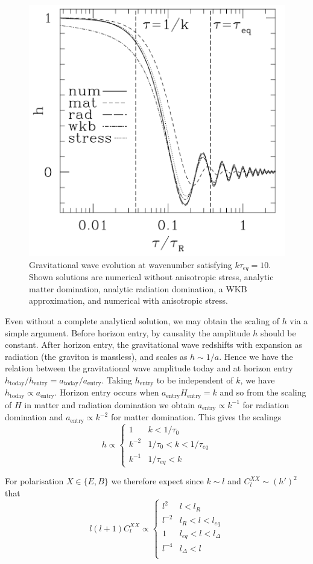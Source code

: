 \documentclass[a4paper,10pt]{article}
\begin{document}
\begin{figure}[h]
  \includegraphics[width=0.5\linewidth]{gravwaveev.png}
  \centering
  \caption{Gravitational wave evolution at wavenumber satisfying $k\tau_{eq}=10$. Shown solutions are numerical without anisotropic stress, analytic matter domination, analytic radiation domination, a WKB approximation, and numerical with anisotropic stress.}
  \label{gravwave}
\end{figure}

Even without a complete analytical solution, we may obtain the scaling of $h$ via a simple argument. Before horizon entry,  by causality the amplitude $h$ should be constant. After horizon entry, the gravitational wave redshifts with expansion as radiation (the graviton is massless), and scales as $h\sim 1/a$. Hence we have the relation between the gravitational wave amplitude today and at horizon entry $h_{\text{today}}/h_{\text{entry}} = a_{\text{today}}/a_{\text{entry}}$. Taking $h_{\text{entry}}$ to be independent of $k$, we have $h_{\text{today}}\propto a_{\text{entry}}$. Horizon entry occurs when $a_{\text{entry}}H_{\text{entry}}=k$ and so from the scaling of $H$ in matter and radiation domination we obtain $a_{\text{entry}}\propto k^{-1}$ for radiation domination and $a_{\text{entry}}\propto k^{-2}$ for matter domination. This gives the scalings
\begin{equation}
  h \propto
    \begin{cases}
      1 & k<1/\tau_0\\
      k^{-2} & 1/\tau_0<k<1/\tau_{eq}\\
      k^{-1} & 1/\tau_{eq}<k
    \end{cases}       
\end{equation}

For polarisation $X\in\{E,B\}$ we therefore expect since $k\sim l$ and $C_l^{XX}\sim (h')^2$ that
\begin{equation}
  l(l+1)C_l^{XX} \propto
    \begin{cases}
      l^2 & l<l_R\\
      l^{-2} & l_R<l<l_{eq}\\
      1 & l_{eq}<l<l_\Delta \\
      l^{-4} & l_\Delta<l \\
    \end{cases}       
\end{equation}
\end{document}
